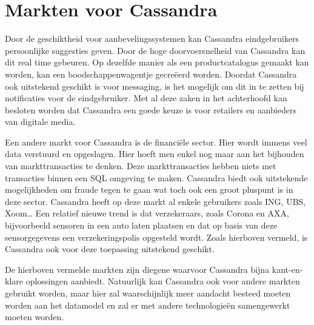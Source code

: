 \section{Markten voor Cassandra}
Door de geschiktheid voor aanbevelingssystemen kan Cassandra eindgebruikers persoonlijke suggesties geven.
Door de hoge doorvoersnelheid van Cassandra kan dit real time gebeuren.
Op dezelfde manier als een productcatalogus gemaakt kan worden, kan een boodschappenwagentje gecreëerd worden.
Doordat Cassandra ook uitstekend geschikt is voor messaging, is het mogelijk om dit in te zetten bij notificaties voor de eindgebruiker.
Met al deze zaken in het achterhoofd kan besloten worden dat Cassandra een goede keuze is voor retailers en aanbieders van digitale media.

Een andere markt voor Cassandra is de financiële sector.
Hier wordt immens veel data verstuurd en opgeslagen.
Hier hoeft men enkel nog maar aan het bijhouden van markttransacties te denken.
Deze markttransacties hebben niets met transacties binnen een SQL omgeving te maken.
Cassandra biedt ook uitstekende mogelijkheden om fraude tegen te gaan wat toch ook een groot pluspunt is in deze sector.
Cassandra heeft op deze markt al enkele gebruikers zoals ING, UBS, Xoom\dots
Een relatief nieuwe trend is dat verzekeraars, zoals Corona en AXA, bijvoorbeeld sensoren in een auto laten plaatsen en dat op basis van deze sensorgegevens een verzekeringspolis opgesteld wordt.
Zoals hierboven vermeld, is Cassandra ook voor deze toepassing uitstekend geschikt.

De hierboven vermelde markten zijn diegene waarvoor Cassandra bijna kant-en-klare oplossingen aanbiedt.
Natuurlijk kan Cassandra ook voor andere markten gebruikt worden, maar hier zal waarschijnlijk meer aandacht besteed moeten worden aan het datamodel en zal er met andere technologieën samengewerkt moeten worden.